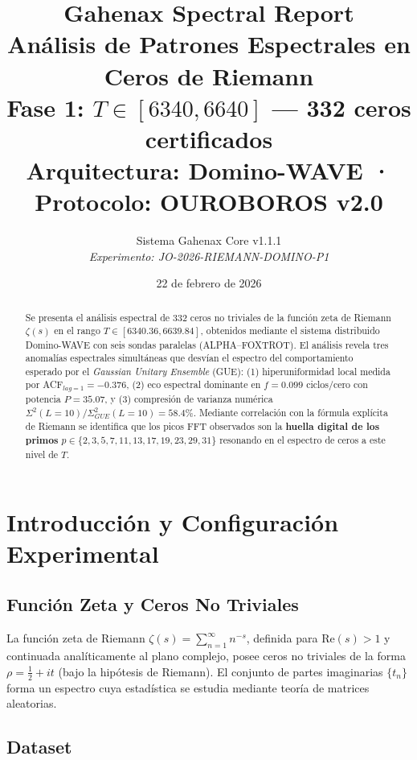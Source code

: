 \documentclass[12pt, a4paper]{article}
\title{
  \textbf{\textcolor{gahenax}{Gahenax Spectral Report}}\\[0.5em]
  {\large Análisis de Patrones Espectrales en Ceros de Riemann}\\[0.3em]
  {\normalsize Fase 1: $T \in [6340, 6640]$ — 332 ceros certificados}\\[0.3em]
  {\small Arquitectura: Domino-WAVE · Protocolo: OUROBOROS v2.0}
}
\author{
  Sistema Gahenax Core v1.1.1\\
  \textit{Experimento: JO-2026-RIEMANN-DOMINO-P1}
}
\date{22 de febrero de 2026}
\begin{document}
\maketitle
\thispagestyle{fancy}

\begin{abstract}
Se presenta el análisis espectral de 332 ceros no triviales de la función
zeta de Riemann $\zeta(s)$ en el rango $T \in [6340.36, 6639.84]$,
obtenidos mediante el sistema distribuido Domino-WAVE con seis sondas
paralelas (ALPHA–FOXTROT). El análisis revela tres anomalías espectrales
simultáneas que desvían el espectro del comportamiento esperado por el
\emph{Gaussian Unitary Ensemble} (GUE): (1) hiperuniformidad local
medida por ACF$_{lag=1} = -0.376$, (2) eco espectral dominante en
$f = 0.099$ ciclos/cero con potencia $P = 35.07$, y (3) compresión de
varianza numérica $\Sigma^2(L=10) / \Sigma^2_{GUE}(L=10) = 58.4\%$.
Mediante correlación con la fórmula explícita de Riemann se identifica
que los picos FFT observados son la \textbf{huella digital de los primos}
$p \in \{2, 3, 5, 7, 11, 13, 17, 19, 23, 29, 31\}$ resonando en el
espectro de ceros a este nivel de $T$.
\end{abstract}

\tableofcontents
\newpage

\section{Introducción y Configuración Experimental}

\subsection{Función Zeta y Ceros No Triviales}

La función zeta de Riemann $\zeta(s) = \sum_{n=1}^{\infty} n^{-s}$,
definida para $\text{Re}(s) > 1$ y continuada analíticamente al plano
complejo, posee ceros no triviales de la forma $\rho = \frac{1}{2} + it$
(bajo la hipótesis de Riemann). El conjunto de partes imaginarias
$\{t_n\}$ forma un espectro cuya estadística se estudia mediante teoría
de matrices aleatorias.

\subsection{Dataset}
\end{document}
